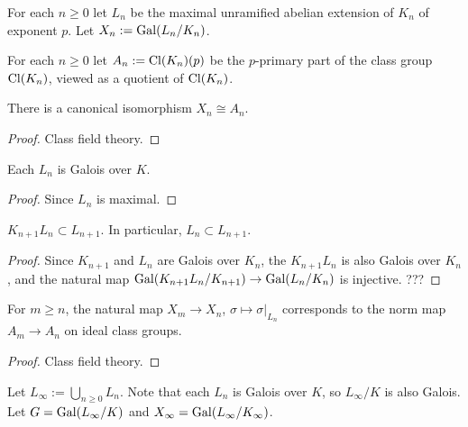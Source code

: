 \begin{definition}
\label{Zp-ext-Ln}
For each $n\geq 0$ let $L_n$ be the
maximal unramified abelian extension of $K_n$
of exponent $p$.
Let $X_n:={\mathrm{Gal}}(L_n/K_n)$.
\end{definition}

\begin{definition}
\label{Zp-ext-An}
For each $n\geq 0$ let $A_n:={\mathrm{Cl}}(K_n)(p)$ be the
$p$-primary part of the class group ${\mathrm{Cl}}(K_n)$,
viewed as a quotient of ${\mathrm{Cl}}(K_n)$.
\end{definition}

\begin{prop}
\label{Xn-isom-An}
There is a canonical isomorphism $X_n\cong A_n$.
\end{prop}

\begin{proof}
Class field theory.
\end{proof}

\begin{lem}
\label{Ln-K-Gal}
Each $L_n$ is Galois over $K$.
\end{lem}

\begin{proof}
Since $L_n$ is maximal.
\end{proof}

\begin{lem}
\label{Ln-mono}
$K_{n+1}L_n\subset L_{n+1}$. In particular, $L_n\subset L_{n+1}$.
\end{lem}

\begin{proof}
Since $K_{n+1}$ and $L_n$ are Galois over $K_n$,
the $K_{n+1}L_n$ is also Galois over $K_n$,
and the natural map
${\mathrm{Gal}}(K_{n+1}L_n/K_{n+1})\to{\mathrm{Gal}}(L_n/K_n)$ is injective.
???
\end{proof}

\begin{prop}
\label{Xn-map-eq-An-map}
For $m\geq n$, the natural map $X_m\to X_n$, $\sigma\mapsto\sigma|_{L_n}$
corresponds to the norm map $A_m\to A_n$ on ideal class groups.
\end{prop}

\begin{proof}
Class field theory.
\end{proof}

\begin{definition}
\label{Zp-ext-L-inf}
Let $L_\infty:=\bigcup_{n\geq 0}L_n$.
Note that each $L_n$ is Galois over $K$, so $L_\infty/K$ is also Galois.
Let $G={\mathrm{Gal}}(L_\infty/K)$ and $X_\infty={\mathrm{Gal}}(L_\infty/K_\infty)$.
\end{definition}

